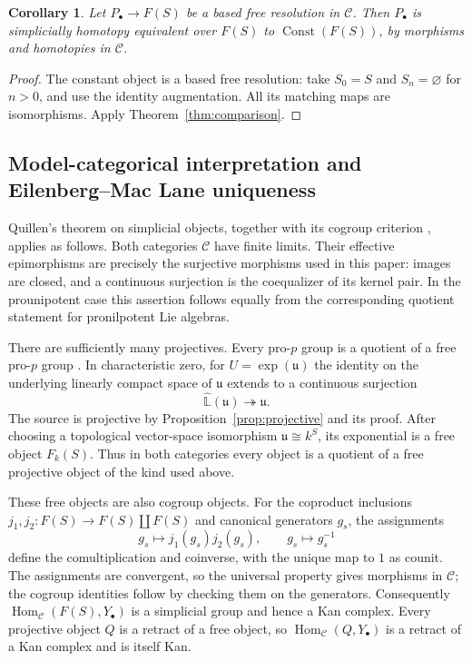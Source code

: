 \documentclass[11pt,a4paper]{article}
\newtheorem{corollary}[theorem]{Corollary}
\theoremstyle{definition}
\newcommand{\C}{\mathcal C}
\newcommand{\Hom}{\operatorname{Hom}}
\newcommand{\Const}{\operatorname{Const}}
\newcommand{\LL}{\widehat{\mathbb L}}
\begin{document}
\begin{corollary}\label{cor:constant}
Let $P_\bullet\to F(S)$ be a based free resolution in $\C$.
Then $P_\bullet$ is simplicially homotopy equivalent over $F(S)$
to $\Const(F(S))$, by morphisms and homotopies in $\C$.
\end{corollary}
\begin{proof}
The constant object is a based free resolution: take $S_0=S$ and
$S_n=\varnothing$ for $n>0$, and use the identity augmentation.
All its matching maps are isomorphisms. Apply
Theorem~\ref{thm:comparison}.
\end{proof}


\subsection*{Model-categorical interpretation and Eilenberg--Mac Lane uniqueness}

Quillen's theorem on simplicial objects, together with its cogroup
criterion \cite[Chapter~II, \S4]{QuillenHA}, applies as follows.
Both categories $\C$ have finite limits. Their effective epimorphisms
are precisely the surjective morphisms used in this paper: images are
closed, and a continuous surjection is the coequalizer of its kernel
pair. In the prounipotent case this assertion follows equally from
the corresponding quotient statement for pronilpotent Lie algebras.

There are sufficiently many projectives. Every pro-$p$ group is a
quotient of a free pro-$p$ group
\cite[Sections~7.6--7.7]{RibesZalesskii}. In characteristic zero, for
$U=\exp(\mathfrak u)$ the identity on the underlying linearly compact
space of $\mathfrak u$ extends to a continuous surjection
\[
 \LL(\mathfrak u)\twoheadrightarrow\mathfrak u.
\]
The source is projective by Proposition~\ref{prop:projective} and its
proof. After choosing a topological vector-space isomorphism
$\mathfrak u\cong k^S$, its exponential is a free object $F_k(S)$.
Thus in both categories every object is a quotient of a free
projective object of the kind used above.

These free objects are also cogroup objects. For the coproduct
inclusions $j_1,j_2:F(S)\to F(S)\amalg F(S)$ and canonical
generators $g_s$, the assignments
\[
 g_s\longmapsto j_1(g_s)j_2(g_s),\qquad
 g_s\longmapsto g_s^{-1}
\]
define the comultiplication and coinverse, with the unique map to $1$
as counit. The assignments are convergent, so the universal property
gives morphisms in $\C$; the cogroup identities follow by checking
them on the generators. Consequently
$\Hom_{\C}(F(S),Y_\bullet)$ is a simplicial group and hence a Kan
complex. Every projective object $Q$ is a retract of a free object,
so $\Hom_{\C}(Q,Y_\bullet)$ is a retract of a Kan complex and is
itself Kan.
\end{document}
